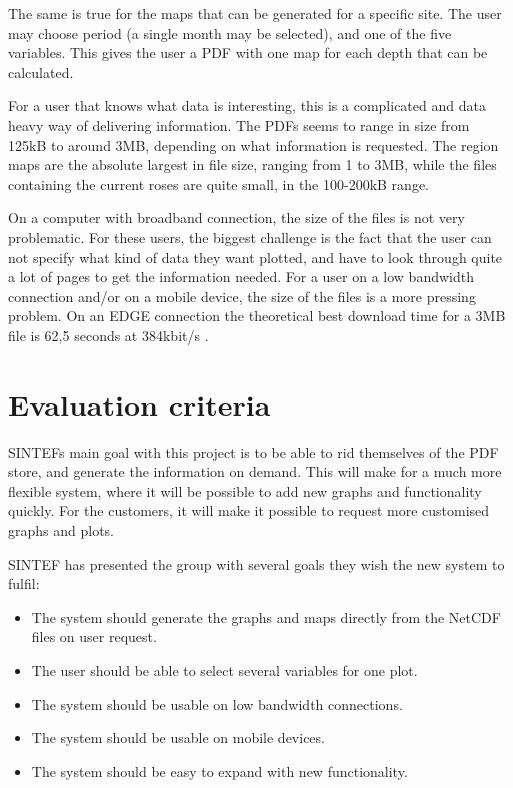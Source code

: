 \documentclass[11pt,a4paper,titlepage,oneside]{report}
\begin{document}
The same is true for the maps that can be generated for a specific site. The user may choose period (a single month may be selected), and one of the five variables. This gives the user a PDF with one map for each depth that can be calculated. 

For a user that knows what data is interesting, this is a complicated and data heavy way of delivering information. The PDFs seems to range in size from 125kB to around 3MB, depending on what information is requested. The region maps are the absolute largest in file size, ranging from 1 to 3MB, while the files containing the current roses are quite small, in the 100-200kB range. 

On a computer with broadband connection, the size of the files is not very problematic. For these users, the biggest challenge is the fact that the user can not specify what kind of data they want plotted, and have to look through quite a lot of pages to get the information needed. For a user on a low bandwidth connection and/or on a mobile device, the size of the files is a more pressing problem. On an EDGE connection the theoretical best download time for a 3MB file is 62,5 seconds at 384kbit/s \cite{3gpp.com}.

\section{Evaluation criteria}
SINTEFs main goal with this project is to be able to rid themselves of the PDF store, and generate the information on demand. This will make for a much more flexible system, where it will be possible to add new graphs and functionality quickly. For the customers, it will make it possible to request more customised graphs and plots.

SINTEF has presented the group with several goals they wish the new system to fulfil:

\begin{itemize}
\item The system should generate the graphs and maps directly from the NetCDF files on user request.
\item The user should be able to select several variables for one plot.
\item The system should be usable on low bandwidth connections.
\item The system should be usable on mobile devices.
\item The system should be easy to expand with new functionality.
\end{itemize} 
\end{document}
